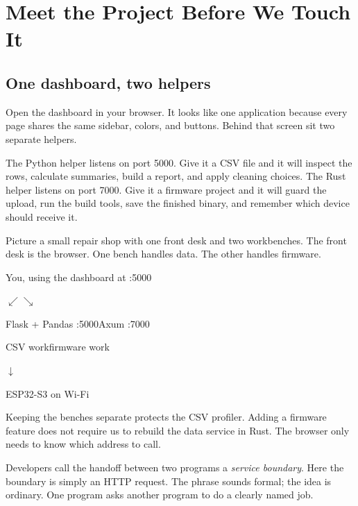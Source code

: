 \chapter{Meet the Project Before We Touch It}

\section{One dashboard, two helpers}

Open the dashboard in your browser. It looks like one application because every page shares the same sidebar, colors, and buttons. Behind that screen sit two separate helpers.

The Python helper listens on port 5000. Give it a CSV file and it will inspect the rows, calculate summaries, build a report, and apply cleaning choices. The Rust helper listens on port 7000. Give it a firmware project and it will guard the upload, run the build tools, save the finished binary, and remember which device should receive it.

Picture a small repair shop with one front desk and two workbenches. The front desk is the browser. One bench handles data. The other handles firmware.

\begin{center}
\begin{tcolorbox}[width=0.9\textwidth,colback=BookPaper,colframe=BookTealLight,arc=3pt]
\centering\ttfamily
You, using the dashboard at :5000\par
\vspace{0.25em}
$\swarrow$\hspace{7em}$\searrow$\par
\vspace{0.25em}
Flask + Pandas :5000\hspace{3em}Axum :7000\par
CSV work\hspace{8em}firmware work\par
\hspace*{13em}$\downarrow$\par
\hspace*{11em}ESP32-S3 on Wi-Fi
\end{tcolorbox}
\end{center}

Keeping the benches separate protects the CSV profiler. Adding a firmware feature does not require us to rebuild the data service in Rust. The browser only needs to know which address to call.

\begin{mentorbox}
Developers call the handoff between two programs a \emph{service boundary}. Here the boundary is simply an HTTP request. The phrase sounds formal; the idea is ordinary. One program asks another program to do a clearly named job.
\end{mentorbox}

